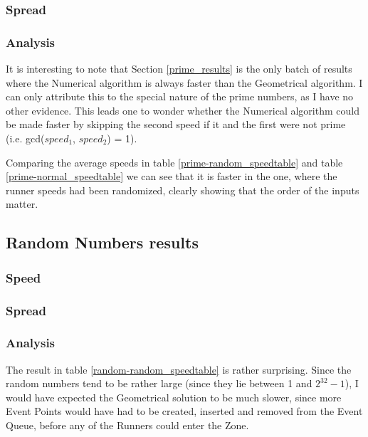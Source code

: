 \subsubsection*{Spread}
\FloatBarrier



\FloatBarrier
\subsubsection*{Analysis}
\label{result_prime}
It is interesting to note that Section \ref{prime_results} is the only batch of results where the Numerical algorithm is always faster than the Geometrical algorithm. I can only attribute this to the special nature of the prime numbers, as I have no other evidence. This leads one to wonder whether the Numerical algorithm could be made faster by skipping the second speed if it and the first were not prime (i.e. gcd($speed_1$, $speed_2$) = 1).

Comparing the average speeds in table \ref{prime-random_speedtable} and table \ref{prime-normal_speedtable} we can see that it is faster in the one, where the runner speeds had been randomized, clearly showing that the order of the inputs matter.

\subsection{Random Numbers results}

\subsubsection*{Speed}
\FloatBarrier
\label{random_results}



\FloatBarrier
\subsubsection*{Spread}
\FloatBarrier



\FloatBarrier
\subsubsection*{Analysis}
The result in table \ref{random-random_speedtable} is rather surprising. Since the random numbers tend to be rather large (since they lie between 1 and $2^{32} - 1$), I would have expected the Geometrical solution to be much slower, since more Event Points would have had to be created, inserted and removed from the Event Queue, before any of the Runners could enter the Zone.\\




